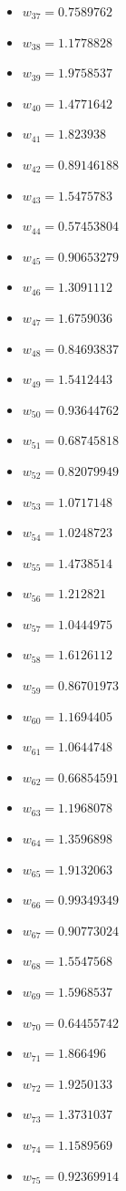 \documentclass[11pt]{article}
\begin{document}
\begin{itemize}
\item $w_{37} = 0.7589762$
\item $w_{38} = 1.1778828$
\item $w_{39} = 1.9758537$
\item $w_{40} = 1.4771642$
\item $w_{41} = 1.823938$
\item $w_{42} = 0.89146188$
\item $w_{43} = 1.5475783$
\item $w_{44} = 0.57453804$
\item $w_{45} = 0.90653279$
\item $w_{46} = 1.3091112$
\item $w_{47} = 1.6759036$
\item $w_{48} = 0.84693837$
\item $w_{49} = 1.5412443$
\item $w_{50} = 0.93644762$
\item $w_{51} = 0.68745818$
\item $w_{52} = 0.82079949$
\item $w_{53} = 1.0717148$
\item $w_{54} = 1.0248723$
\item $w_{55} = 1.4738514$
\item $w_{56} = 1.212821$
\item $w_{57} = 1.0444975$
\item $w_{58} = 1.6126112$
\item $w_{59} = 0.86701973$
\item $w_{60} = 1.1694405$
\item $w_{61} = 1.0644748$
\item $w_{62} = 0.66854591$
\item $w_{63} = 1.1968078$
\item $w_{64} = 1.3596898$
\item $w_{65} = 1.9132063$
\item $w_{66} = 0.99349349$
\item $w_{67} = 0.90773024$
\item $w_{68} = 1.5547568$
\item $w_{69} = 1.5968537$
\item $w_{70} = 0.64455742$
\item $w_{71} = 1.866496$
\item $w_{72} = 1.9250133$
\item $w_{73} = 1.3731037$
\item $w_{74} = 1.1589569$
\item $w_{75} = 0.92369914$

\end{itemize}
\end{document}
